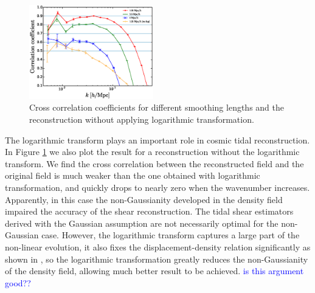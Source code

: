 \documentclass[aps,prd,twocolumn,showpacs,superscriptaddress,groupedaddress,nofootinbib]{revtex4}  %
\begin{document}
\begin{figure}[tbp]
\begin{center}
\includegraphics[width=0.48\textwidth]{fig2d.eps}
\end{center}
\vspace{-0.7cm}
\caption{\label{fig:2} Cross correlation coefficients for different 
smoothing lengths and the reconstruction without applying logarithmic transformation.}
\end{figure}

The logarithmic transform plays an important role in cosmic tidal 
reconstruction. In  Figure \ref{fig:2} we also plot the result for a reconstruction 
without the logarithmic transform. We find the cross correlation between the 
reconstructed field and the original field is much weaker than the 
one obtained with logarithmic transformation,  and quickly drops to nearly zero when the wavenumber increases. 
Apparently,  in this case the non-Gaussianity developed in the density field 
impaired the accuracy of the shear reconstruction. The tidal shear
estimators derived with the Gaussian assumption are not necessarily optimal
for the non-Gaussian case. However, the logarithmic transform captures a large part of the 
non-linear evolution, it also fixes the displacement-density relation significantly as shown in 
\cite{2012:log}, so the logarithmic transformation greatly reduces the 
non-Gaussianity of the density field, allowing much better result to be achieved.
\textcolor{blue}{is this argument good??}

\end{document}
